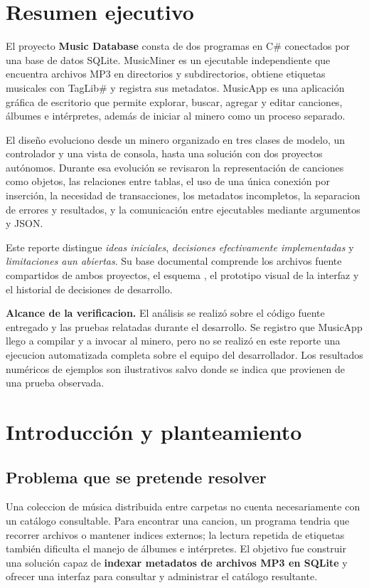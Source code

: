 \documentclass[11pt,a4paper,oneside]{article}
\newcommand{\file}[1]{\texttt{\detokenize{#1}}}
\newcommand{\R}{\textsf{MusicMiner}}
\newcommand{\A}{\textsf{MusicApp}}
\begin{document}
\section*{Resumen ejecutivo}
El proyecto \textbf{Music Database} consta de dos programas en C\# conectados por una base de datos SQLite. \R{} es un ejecutable independiente que encuentra archivos MP3 en directorios y subdirectorios, obtiene etiquetas musicales con TagLib\# y registra sus metadatos. \A{} es una aplicación gráfica de escritorio que permite explorar, buscar, agregar y editar canciones, álbumes e intérpretes, además de iniciar al minero como un proceso separado.

El diseño evoluciono desde un minero organizado en tres clases de modelo, un controlador y una vista de consola, hasta una solución con dos proyectos autónomos. Durante esa evolución se revisaron la representación de canciones como objetos, las relaciones entre tablas, el uso de una única conexión por inserción, la necesidad de transacciones, los metadatos incompletos, la separacion de errores y resultados, y la comunicación entre ejecutables mediante argumentos y JSON.

Este reporte distingue \emph{ideas iniciales}, \emph{decisiones efectivamente implementadas} y \emph{limitaciones aun abiertas}. Su base documental comprende los archivos fuente compartidos de ambos proyectos, el esquema \file{rolas.sql}, el prototipo visual de la interfaz y el historial de decisiones de desarrollo.

\begin{notabox}
\textbf{Alcance de la verificacion.} El análisis se realizó sobre el código fuente entregado y las pruebas relatadas durante el desarrollo. Se registro que \A{} llego a compilar y a invocar al minero, pero no se realizó en este reporte una ejecucion automatizada completa sobre el equipo del desarrollador. Los resultados numéricos de ejemplos son ilustrativos salvo donde se indica que provienen de una prueba observada.
\end{notabox}
\tableofcontents
\clearpage
{}

\section{Introducción y planteamiento}
\subsection{Problema que se pretende resolver}
Una coleccion de música distribuida entre carpetas no cuenta necesariamente con un catálogo consultable. Para encontrar una cancion, un programa tendria que recorrer archivos o mantener indices externos; la lectura repetida de etiquetas también dificulta el manejo de álbumes e intérpretes. El objetivo fue construir una solución capaz de \textbf{indexar metadatos de archivos MP3 en SQLite} y ofrecer una interfaz para consultar y administrar el catálogo resultante.
\end{document}
